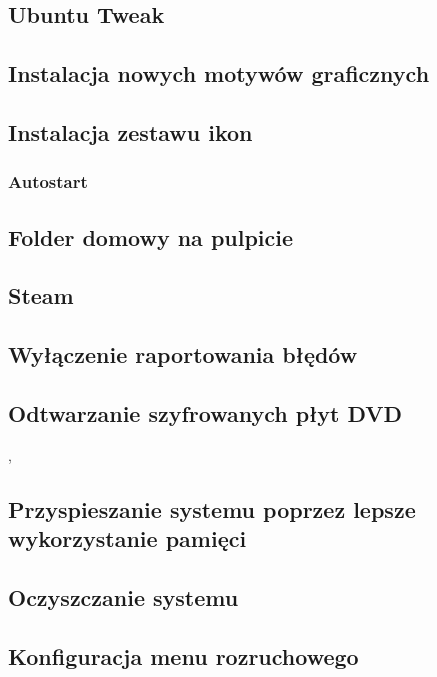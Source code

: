 \documentclass[a4paper,11pt,oneside]{mwart}
\begin{document}
		\subsection{Ubuntu Tweak}
			
		\subsection{Instalacja nowych motywów graficznych}
			
		\subsection{Instalacja zestawu ikon}
			
		\subsubsection{Autostart}
			
		\subsection{Folder domowy na pulpicie}
			
		\subsection{Steam}
			
		\subsection{Wyłączenie raportowania błędów}
			
		\subsection{Odtwarzanie szyfrowanych płyt DVD}
,			
		\subsection{Przyspieszanie systemu poprzez lepsze wykorzystanie pamięci}
			
		\subsection{Oczyszczanie systemu}
			
		\subsection{Konfiguracja menu rozruchowego}
			
\end{document}

